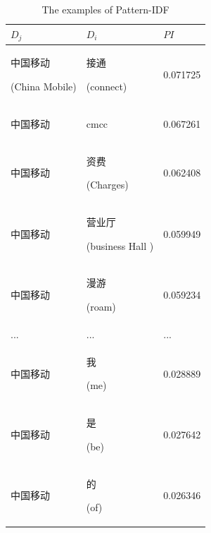 \documentclass{sig-alternate}
\begin{document}
\begin{table}[]
\centering
\caption{The examples of Pattern-IDF}
\label{my-label}
\begin{tabular}{lll}
\hline
 $D_j$ & $D_i$ & $PI$ \\ \hline
 \begin{CJK}{UTF8}{gbsn}中国移动\end{CJK} (China Mobile) & \begin{CJK}{UTF8}{gbsn}接通\end{CJK} (connect)   & 0.071725 \\ \hline
 \begin{CJK}{UTF8}{gbsn}中国移动\end{CJK} & cmcc                                  & 0.067261 \\ \hline
 \begin{CJK}{UTF8}{gbsn}中国移动\end{CJK} & \begin{CJK}{UTF8}{gbsn}资费\end{CJK} (Charges)   & 0.062408 \\ \hline
 \begin{CJK}{UTF8}{gbsn}中国移动\end{CJK} & \begin{CJK}{UTF8}{gbsn}营业厅\end{CJK} (business Hall
) & 0.059949 \\ \hline
 \begin{CJK}{UTF8}{gbsn}中国移动\end{CJK} & \begin{CJK}{UTF8}{gbsn}漫游\end{CJK} (roam)   & 0.059234 \\ \hline
 ... & ...  & ...  \\ \hline
 \begin{CJK}{UTF8}{gbsn}中国移动\end{CJK} & \begin{CJK}{UTF8}{gbsn}我\end{CJK} (me)   & 0.028889 \\ \hline
 \begin{CJK}{UTF8}{gbsn}中国移动\end{CJK} & \begin{CJK}{UTF8}{gbsn}是\end{CJK} (be)   & 0.027642 \\ \hline
 \begin{CJK}{UTF8}{gbsn}中国移动\end{CJK} & \begin{CJK}{UTF8}{gbsn}的\end{CJK} (of)   & 0.026346 \\ \hline
\end{tabular}
\end{table}
\end{document}
